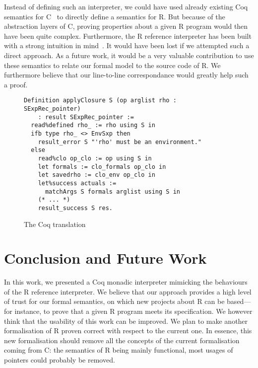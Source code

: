 \documentclass[9pt, sigplan, natbib=false, screen=true]{acmart}
\newcommand\Coq{Coq}
\newcommand\R{R}
\newcommand\Cn{C}
\begin{document}
Instead of defining such an interpreter,
we could have used already existing \Coq{} semantics
for \Cn{}~\parencite{formalin, Leroy-Compcert-CACM}
to directly define a semantics for \R{}.
But because of the abstraction layers of \Cn{},
proving properties about a given \R{} program
would then have been quite complex.
Furthermore, the \R{} reference interpreter has been built
with a strong intuition in mind~\parencite{ihaka1996r}.
It would have been lost if we attempted such a direct approach.
%
As a future work, it would be a very valuable contribution
to use these semantics to relate
our formal model to the source code of \R{}.
We furthermore believe that our line-to-line correspondance
would greatly help such a proof.

\begin{figure}
\begin{verbatim}
Definition applyClosure S (op arglist rho : SExpRec_pointer)
    : result SExpRec_pointer :=
  read%defined rho_ := rho using S in
  ifb type rho_ <> EnvSxp then
    result_error S "'rho' must be an environment."
  else
    read%clo op_clo := op using S in
    let formals := clo_formals op_clo in
    let savedrho := clo_env op_clo in
    let%success actuals :=
      matchArgs S formals arglist using S in
    (* ... *)
    result_success S res.
\end{verbatim}
    \caption{The \Coq{} translation}
    \label{fig:coq}
\end{figure}


\section{Conclusion and Future Work}
\label{sec:conclusion}

In this work, we presented a \Coq{} monadic interpreter
mimicking the behaviours of the \R{} reference interpreter.
We believe that our approach provides a high level of trust
for our formal semantics,
on which new projects about \R{} can be based---%
for instance,
to prove that a given \R{} program meets its specification.
We however think that the usability of this work can be improved.
We plan to make another formalisation
of \R{} proven correct with respect to the current one.
In essence, this new formalisation should
remove all the concepts of the current formalisation coming from \Cn{}:
the semantics of \R{} being mainly functional,
most usages of pointers could probably be removed.

%
%
%
%


\printbibliography
\end{document}
